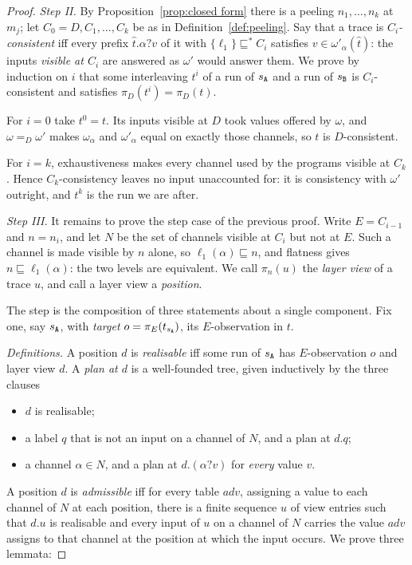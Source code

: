 \documentclass[preprint,5p,twocolumn]{elsarticle}
\begin{document}
\begin{proof}
  \emph{Step II.} By Proposition~\ref{prop:closed form} there is a peeling
  $n_1,\dots,n_k$ at $m_j$; let $C_0 = D, C_1, \dots, C_k$ be as in
  Definition~\ref{def:peeling}. Say that a trace is
  \emph{$C_i$-consistent} iff every prefix $\hat{t}.\alpha ? v$ of it with $\lbrace \ell_1 \rbrace
  \sqsubseteq^* C_i$ satisfies $v \in \omega'_\alpha(\hat{t})$: the inputs \emph{visible at $C_i$}
  are answered as $\omega'$ would answer them. We prove by induction on
  $i$ that some interleaving $t^i$ of a run of $s_{\mathtt{A}}$ and a run of $s_{\mathtt{B}}$ is $C_i$-consistent and
  satisfies $\pi_D(t^i) = \pi_D(t)$.

  For $i = 0$ take $t^0 = t$. Its inputs visible at $D$ took values offered by $\omega$, and
  $\omega =_D \omega'$ makes $\omega_\alpha$ and $\omega'_\alpha$ equal on exactly those channels,
  so $t$ is $D$-consistent.

  For $i = k$, exhaustiveness makes every channel used by the programs visible at $C_k$. Hence
  $C_k$-consistency leaves no input unaccounted for: it is consistency with $\omega'$ outright, and
  $t^k$ is the run we are after.

  \emph{Step III.} It remains to prove the step case of the previous proof.
  Write $E = C_{i-1}$ and $n = n_i$, and let $N$ be the set of channels
  visible at $C_i$ but not at $E$. Such a channel is made visible by
  $n$ alone, so $\ell_1(\alpha) \sqsubseteq n$, and flatness gives $n \sqsubseteq \ell_1(\alpha)$:
  the two levels are equivalent. We call $\pi_n(u)$ the \emph{layer view} of a trace $u$, and call a layer view a
  \emph{position}.

  The step is the composition of three statements about a single component. Fix one, say $s_{\mathtt{A}}$, with
  \emph{target} $o = \pi_E(t_{s_{\mathtt{A}}})$, its $E$-observation in $t$.

  \emph{Definitions.} A position $d$ is \emph{realisable} iff some run of $s_{\mathtt{A}}$ has $E$-observation
  $o$ and layer view $d$. A \emph{plan at $d$} is a well-founded tree, given inductively by the
  three clauses
  \begin{itemize}
    \item[\textsc{stop}:] $d$ is realisable;
    \item[\textsc{emit}:] a label $q$ that is not an input on a channel of $N$, and a plan at $d.q$;
    \item[\textsc{ask}:] a channel $\alpha \in N$, and a plan at $d.(\alpha ? v)$ for \emph{every}
      value $v$.
  \end{itemize}
  A position $d$ is \emph{admissible} iff for every table $adv$, assigning a value to each channel of
  $N$ at each position, there is a finite sequence $u$ of view entries such that $d.u$ is realisable
  and every input of $u$ on a channel of $N$ carries the value $adv$ assigns to that channel at the
  position at which the input occurs. We prove three lemmata:


\end{proof}
\end{document}
